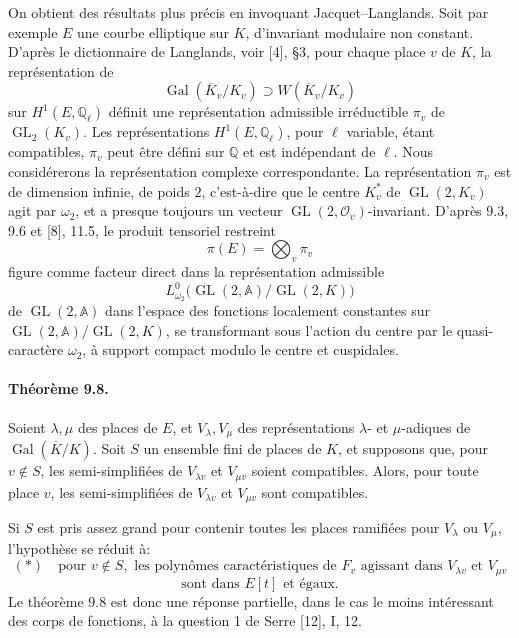 \documentclass[10pt,letterpaper]{article}
\newcommand{\Q}{\mathbb Q}
\newcommand{\Gal}{\operatorname{Gal}}
\newcommand{\GL}{\operatorname{GL}}
\providecommand{\Gal}{\operatorname{Gal}}
\providecommand{\GL}{\operatorname{GL}}
\providecommand{\Gal}{\operatorname{Gal}}
\providecommand{\GL}{\operatorname{GL}}
\providecommand{\Gal}{\operatorname{Gal}}
\providecommand{\Gal}{\operatorname{Gal}}
\begin{document}
On obtient des résultats plus précis en invoquant Jacquet--Langlands. Soit par exemple $E$ une courbe elliptique sur $K$, d'invariant modulaire non constant. D'après le dictionnaire de Langlands, voir [4], §3, pour chaque place $v$ de $K$, la représentation de
\[
\Gal(\overline K_v/K_v)\supset W(\overline K_v/K_v)
\]
sur $H^1(E,\Q_\ell)$ définit une représentation admissible irréductible $\pi_v$ de $\GL_2(K_v)$. Les représentations $H^1(E,\Q_\ell)$, pour $\ell$ variable, étant compatibles, $\pi_v$ peut être défini sur $\Q$ et est indépendant de $\ell$. Nous considérerons la représentation complexe correspondante. La représentation $\pi_v$ est de dimension infinie, de poids $2$, c'est-à-dire que le centre $K_v^*$ de $\GL(2,K_v)$ agit par $\omega_2$, et a presque toujours un vecteur $\GL(2,\mathcal O_v)$-invariant. D'après 9.3, 9.6 et [8], 11.5, le produit tensoriel restreint
\[
\pi(E)=\bigotimes_v \pi_v
\]
figure comme facteur direct dans la représentation admissible
\[
L^0_{\omega_2}\bigl(\GL(2,\mathbb A)/\GL(2,K)\bigr)
\]
de $\GL(2,\mathbb A)$ dans l'espace des fonctions localement constantes sur $\GL(2,\mathbb A)/\GL(2,K)$, se transformant sous l'action du centre par le quasi-caractère $\omega_2$, à support compact modulo le centre et cuspidales.

\paragraph{Théorème 9.8.} Soient $\lambda,\mu$ des places de $E$, et $V_\lambda,V_\mu$ des représentations $\lambda$- et $\mu$-adiques de $\Gal(\overline K/K)$. Soit $S$ un ensemble fini de places de $K$, et supposons que, pour $v\notin S$, les semi-simplifiées de $V_{\lambda v}$ et $V_{\mu v}$ soient compatibles. Alors, pour toute place $v$, les semi-simplifiées de $V_{\lambda v}$ et $V_{\mu v}$ sont compatibles.

Si $S$ est pris assez grand pour contenir toutes les places ramifiées pour $V_\lambda$ ou $V_\mu$, l'hypothèse se réduit à:
\[
(*)\quad
\text{pour }v\notin S,\text{ les polynômes caractéristiques de }F_v
\text{ agissant dans }V_{\lambda v}\text{ et }V_{\mu v}
\]
\[
\text{sont dans }E[t]\text{ et égaux.}
\]
Le théorème 9.8 est donc une réponse partielle, dans le cas le moins intéressant des corps de fonctions, à la question 1 de Serre [12], I, 12.
\end{document}
